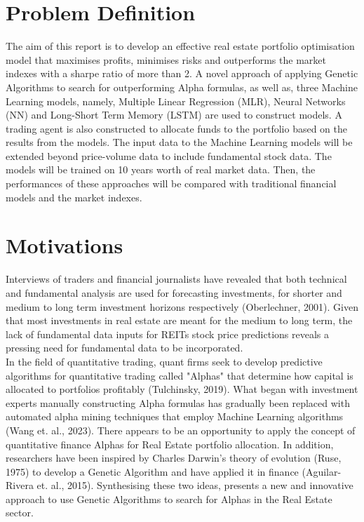 \documentclass[a4paper,12pt]{report}
\numberwithin{equation}{section}
\theoremstyle{definition}
\begin{document}
\section{Problem Definition}
The aim of this report is to develop an effective real estate portfolio optimisation model that maximises profits, minimises risks and outperforms the market indexes with a sharpe ratio of more than 2. A novel approach of applying Genetic Algorithms to search for outperforming Alpha formulas, as well as, three Machine Learning models, namely, Multiple Linear Regression (MLR), Neural Networks (NN) and Long-Short Term Memory (LSTM) are used to construct models. A trading agent is also constructed to allocate funds to the portfolio based on the results from the models. The input data to the Machine Learning models will be extended beyond price-volume data to include fundamental stock data. The models will be trained on 10 years worth of real market data. Then, the performances of these approaches will be compared with traditional financial models and the market indexes.

\section{Motivations}
Interviews of traders and financial journalists have revealed that both technical and fundamental analysis are used for forecasting investments, for shorter and medium to long term investment horizons respectively (Oberlechner, 2001). Given that most investments in real estate are meant for the medium to long term, the lack of fundamental data inputs for REITs stock price predictions reveals a pressing need for fundamental data to be incorporated. \\ 

In the field of quantitative trading, quant firms seek to develop predictive algorithms for quantitative trading called "Alphas" that determine how capital is allocated to portfolios profitably (Tulchinsky, 2019). What began with investment experts manually constructing Alpha formulas has gradually been replaced with automated alpha mining techniques that employ Machine Learning algorithms (Wang et. al., 2023). There appears to be an opportunity to apply the concept of quantitative finance Alphas for Real Estate portfolio allocation. In addition, researchers have been inspired by Charles Darwin's theory of evolution (Ruse, 1975) to develop a Genetic Algorithm and have applied it in finance (Aguilar-Rivera et. al., 2015). Synthesising these two ideas, presents a new and innovative approach to use Genetic Algorithms to search for Alphas in the Real Estate sector. \\
\end{document}
